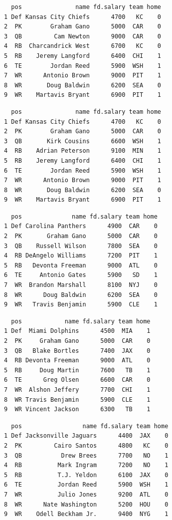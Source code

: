 \documentclass[10pt]{article}
\begin{document}
\begin{lstlisting}
  pos               name fd.salary team home
1 Def Kansas City Chiefs      4700   KC    0
2  PK        Graham Gano      5000  CAR    0
3  QB         Cam Newton      9000  CAR    0
4  RB  Charcandrick West      6700   KC    0
5  RB    Jeremy Langford      6400  CHI    1
6  TE        Jordan Reed      5900  WSH    1
7  WR      Antonio Brown      9000  PIT    1
8  WR       Doug Baldwin      6200  SEA    0
9  WR    Martavis Bryant      6900  PIT    1
\end{lstlisting}

\begin{lstlisting}
  pos               name fd.salary team home
1 Def Kansas City Chiefs      4700   KC    0
2  PK        Graham Gano      5000  CAR    0
3  QB       Kirk Cousins      6600  WSH    1
4  RB    Adrian Peterson      9100  MIN    1
5  RB    Jeremy Langford      6400  CHI    1
6  TE        Jordan Reed      5900  WSH    1
7  WR      Antonio Brown      9000  PIT    1
8  WR       Doug Baldwin      6200  SEA    0
9  WR    Martavis Bryant      6900  PIT    1
\end{lstlisting}

\begin{lstlisting}
  pos              name fd.salary team home
1 Def Carolina Panthers      4900  CAR    0
2  PK       Graham Gano      5000  CAR    0
3  QB    Russell Wilson      7800  SEA    0
4  RB DeAngelo Williams      7200  PIT    1
5  RB   Devonta Freeman      9000  ATL    0
6  TE     Antonio Gates      5900   SD    1
7  WR  Brandon Marshall      8100  NYJ    0
8  WR      Doug Baldwin      6200  SEA    0
9  WR   Travis Benjamin      5900  CLE    1
\end{lstlisting}

\begin{lstlisting}
  pos            name fd.salary team home
1 Def  Miami Dolphins      4500  MIA    1
2  PK     Graham Gano      5000  CAR    0
3  QB   Blake Bortles      7400  JAX    0
4  RB Devonta Freeman      9000  ATL    0
5  RB     Doug Martin      7600   TB    1
6  TE      Greg Olsen      6600  CAR    0
7  WR  Alshon Jeffery      7700  CHI    1
8  WR Travis Benjamin      5900  CLE    1
9  WR Vincent Jackson      6300   TB    1
\end{lstlisting}

\begin{lstlisting}
  pos                 name fd.salary team home
1 Def Jacksonville Jaguars      4400  JAX    0
2  PK         Cairo Santos      4800   KC    0
3  QB           Drew Brees      7700   NO    1
4  RB          Mark Ingram      7200   NO    1
5  RB          T.J. Yeldon      6100  JAX    0
6  TE          Jordan Reed      5900  WSH    1
7  WR          Julio Jones      9200  ATL    0
8  WR      Nate Washington      5200  HOU    0
9  WR    Odell Beckham Jr.      9400  NYG    1
\end{lstlisting}
\end{document}
